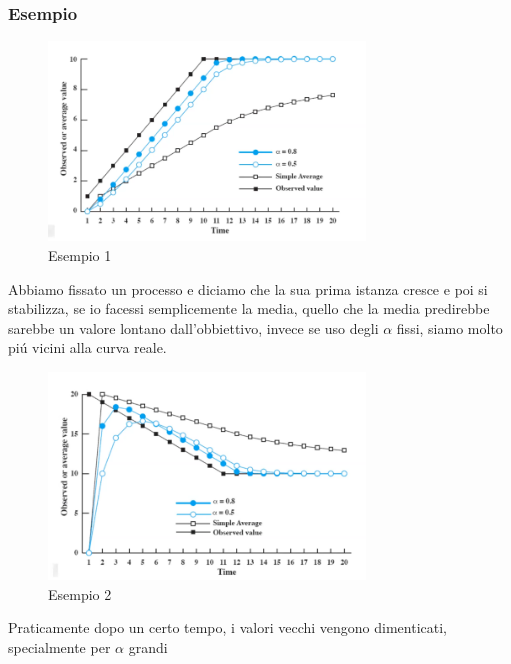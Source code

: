     \subsubsection*{Esempio}
    \begin{figure}[H]
        \centering
        \includegraphics[width=0.75\textwidth]{immagini/EsempioExponentialAveraging}
        \caption{Esempio 1}
    \end{figure}
    Abbiamo fissato un processo e diciamo che la sua prima istanza cresce e poi si stabilizza, se io facessi
    semplicemente la media, quello che la media predirebbe sarebbe un valore lontano dall'obbiettivo, invece
    se uso degli $\alpha$ fissi, siamo molto piú vicini alla curva reale.
    \begin{figure}[H]
        \centering
        \includegraphics[width=0.75\textwidth]{immagini/EsempioExponentialAveraging2}
        \caption{Esempio 2}
    \end{figure}
    Praticamente dopo un certo tempo, i valori vecchi vengono dimenticati, specialmente per $\alpha$ grandi
